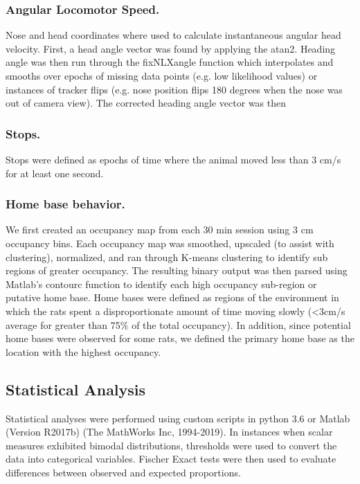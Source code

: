 \documentclass[fleqn,10pt]{wlscirep}
\begin{document}
\subsubsection*{Angular Locomotor Speed.} Nose and head coordinates where used to calculate instantaneous angular head velocity. First, a head angle vector was found by applying the atan2. Heading angle was then run through the fixNLXangle function which interpolates and smooths over epochs of missing data points (e.g. low likelihood values) or instances of tracker flips (e.g. nose position flips 180 degrees when the nose was out of camera view). The corrected heading angle vector was then   
\subsubsection*{Stops.} Stops were defined as epochs of time where the animal moved less than 3 cm/s for at least one second. 
\subsubsection*{Home base behavior.} We first created an occupancy map from each 30 min session using 3 cm occupancy bins. Each occupancy map was smoothed, upscaled (to assist with clustering), normalized, and ran through K-means clustering to identify sub regions of greater occupancy. The resulting binary output was then parsed using Matlab's contourc function to identify each high occupancy sub-region or putative home base. 
Home bases were defined as regions of the environment in which the rats spent a disproportionate amount of time moving slowly (<3cm/s average for greater than 75\% of the total occupancy). In addition, since potential home bases were observed for some rats, we defined the primary home base as the location with the highest occupancy. 

\subsection*{Statistical Analysis} 
	Statistical analyses were performed using custom scripts in python 3.6 or Matlab (Version R2017b) (The MathWorks Inc, 1994-2019). In instances when scalar measures exhibited bimodal distributions, thresholds were used to convert the data into categorical variables. Fischer Exact tests were then used to evaluate differences between observed and expected proportions.




\end{document}
